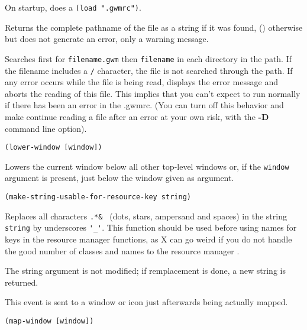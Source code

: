 On startup, {\GWM} does a \verb|(load ".gwmrc")|.

Returns the complete pathname of the file as a string if it was found, ()
otherwise but does not generate an error, only a warning message.

Searches first for \verb"filename.gwm" then \verb"filename" in each
directory in the path. If the filename includes a \verb"/" character, the
file is not searched through the path. If any error occurs while the file is
being read, {\WOOL} displays the error message and aborts the reading of
this file. This implies that you can't expect {\GWM} to run normally if
there has been an error in the .gwmrc. (You can turn off this behavior and
make {\GWM} continue reading a file after an error at your own risk, with
the {\bf -D} command line option).

        
{\usagefont\begin{verbatim}
(lower-window [window])
\end{verbatim}}\usageupspace

Lowers  the current window below all other top-level windows or, if the
\verb"window" argument is present, just below the window given as argument.


{\usagefont\begin{verbatim}
(make-string-usable-for-resource-key string)
\end{verbatim}}\usageupspace

Replaces all characters \verb*|.*& | (dots, stars, ampersand and spaces) in
the string
\verb"string" by underscores \verb"'_'". This function should be used
before using names for keys in the resource manager functions, as X
can go weird if you do not handle the good number of classes and names
to the resource manager .

The string argument is not modified; if remplacement is done, a new
string is returned.



This event is sent to a window or icon just afterwards being actually mapped.

        
{\usagefont\begin{verbatim}
(map-window [window])
\end{verbatim}}\usageupspace

